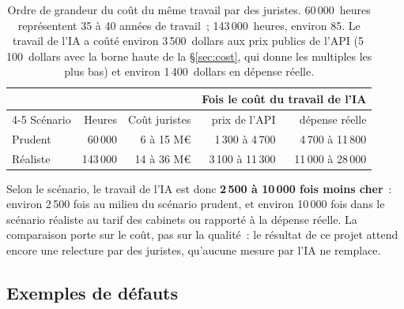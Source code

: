 \documentclass[11pt,a4paper]{article}
\begin{document}
\begin{table}[ht]
\centering
\small
\begin{tabular}{lrrrr}
\toprule
& & & \multicolumn{2}{c}{Fois le coût du travail de l'IA}\\
\cmidrule(lr){4-5}
Scénario & Heures & Coût juristes & prix de l'API & dépense réelle\\
\midrule
Prudent & 60\,000 & 6 à 15 M\euro{} & 1\,300 à 4\,700 & 4\,700 à 11\,800\\
Réaliste & 143\,000 & 14 à 36 M\euro{} & 3\,100 à 11\,300 & 11\,000 à 28\,000\\
\bottomrule
\end{tabular}
\caption{Ordre de grandeur du coût du même travail par des juristes. 60\,000~heures représentent 35 à 40 années de travail~; 143\,000~heures, environ 85. Le travail de l'IA a coûté environ 3\,500~dollars aux prix publics de l'API (5\,100~dollars avec la borne haute de la \S\ref{sec:cost}, qui donne les multiples les plus bas) et environ 1\,400~dollars en dépense réelle.}
\label{tab:lawyers}
\end{table}

Selon le scénario, le travail de l'IA est donc \textbf{2\,500 à 10\,000 fois moins cher}~: environ 2\,500 fois au milieu du scénario prudent, et environ 10\,000 fois dans le scénario réaliste au tarif des cabinets ou rapporté à la dépense réelle. La comparaison porte sur le coût, pas sur la qualité~: le résultat de ce projet attend encore une relecture par des juristes, qu'aucune mesure par l'IA ne remplace.

\subsection{Exemples de défauts}
\end{document}

